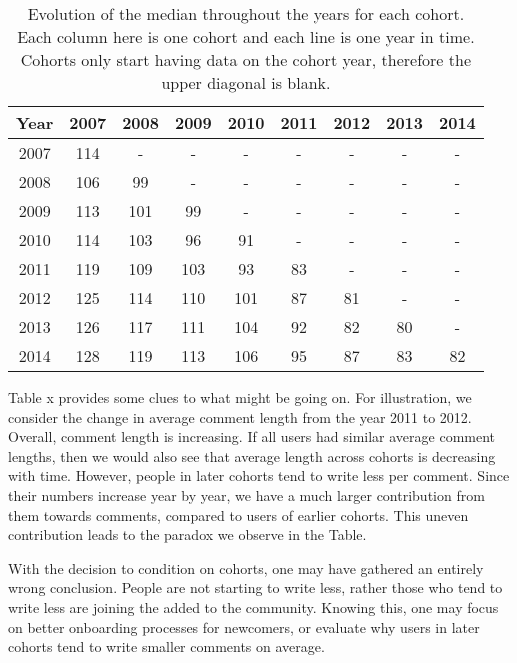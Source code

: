 \begin{table}
\centering
\begin{tabular}{|c|c|c|c|c|c|c|c|c|}
\hline
Year & 2007 & 2008 & 2009 & 2010 & 2011 & 2012 & 2013 & 2014 \\ \hline
2007 & 114 & - & - & - & - & - & - & - \\ \hline
2008 & 106 & 99 & - & - & - & - & - & - \\ \hline
2009 & 113 & 101 & 99 & - & - & - & - & - \\ \hline
2010 & 114 & 103 & 96 & 91 & - & - & - & - \\ \hline
2011 & 119 & 109 & 103 & 93 & 83 & - & - & - \\ \hline
2012 & 125 & 114 & 110 & 101 & 87 & 81 & - & - \\ \hline
2013 & 126 & 117 & 111 & 104 & 92 & 82 & 80 & - \\ \hline
2014 & 128 & 119 & 113 & 106 & 95 & 87 & 83 & 82 \\ \hline
\end{tabular}
\caption{Evolution of the median throughout the years for each cohort. Each column here is one cohort and each line is one year in time. Cohorts only start having data on the cohort year, therefore the upper diagonal is blank.}
\end{table}

Table x provides some clues to what might be going on. For illustration, we consider the change in average comment length from the year 2011 to 2012. Overall, comment length is increasing. If all users had similar average comment lengths, then we would also see that average length across cohorts is decreasing with time. However, people in later cohorts tend to write less per comment. Since their numbers increase year by year, we have a  much larger contribution from them towards comments, compared to users of earlier cohorts. This uneven contribution leads to the paradox we observe in the Table. 

With the decision to condition on cohorts, one may have gathered an entirely wrong conclusion. People  are not starting to write less, rather those who tend to write less are joining the  added to the community. Knowing this, one may focus on better onboarding processes for newcomers, or evaluate why users in later cohorts tend to write smaller comments on average. 
